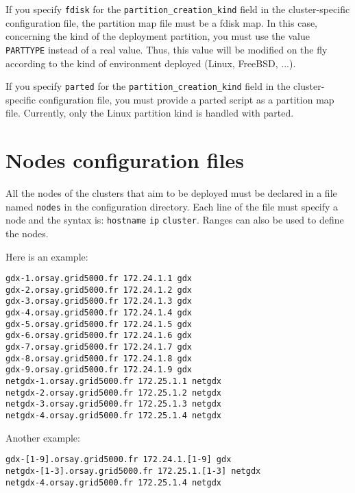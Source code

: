 \documentclass[a4wide,10pt,oneside]{book}
\begin{document}
If you specify \texttt{fdisk} for the \texttt{partition\_creation\_kind} field in the cluster-specific configuration file, the partition map file must be a fdisk map. In this case, concerning the kind of the deployment partition, you must use the value \texttt{PARTTYPE} instead of a real value. Thus, this value will be modified on the fly according to the kind of environment deployed (Linux, FreeBSD, ...).

If you specify \texttt{parted} for the \texttt{partition\_creation\_kind} field in the cluster-specific configuration file, you must provide a parted script as a partition map file. Currently, only the Linux partition kind is handled with parted.

\section{Nodes configuration files}
All the nodes of the clusters that aim to be deployed must be declared in a file named \texttt{nodes} in the configuration directory. Each line of the file must specify a node and the syntax is: \texttt{hostname} \texttt{ip} \texttt{cluster}. Ranges can also be used to define the nodes.

Here is an example:
\begin{small}
\begin{verbatim}
gdx-1.orsay.grid5000.fr 172.24.1.1 gdx
gdx-2.orsay.grid5000.fr 172.24.1.2 gdx
gdx-3.orsay.grid5000.fr 172.24.1.3 gdx
gdx-4.orsay.grid5000.fr 172.24.1.4 gdx
gdx-5.orsay.grid5000.fr 172.24.1.5 gdx
gdx-6.orsay.grid5000.fr 172.24.1.6 gdx
gdx-7.orsay.grid5000.fr 172.24.1.7 gdx
gdx-8.orsay.grid5000.fr 172.24.1.8 gdx
gdx-9.orsay.grid5000.fr 172.24.1.9 gdx
netgdx-1.orsay.grid5000.fr 172.25.1.1 netgdx
netgdx-2.orsay.grid5000.fr 172.25.1.2 netgdx
netgdx-3.orsay.grid5000.fr 172.25.1.3 netgdx
netgdx-4.orsay.grid5000.fr 172.25.1.4 netgdx
\end{verbatim}
\end{small}

Another example:
\begin{small}
\begin{verbatim}
gdx-[1-9].orsay.grid5000.fr 172.24.1.[1-9] gdx
netgdx-[1-3].orsay.grid5000.fr 172.25.1.[1-3] netgdx
netgdx-4.orsay.grid5000.fr 172.25.1.4 netgdx
\end{verbatim}
\end{small}
\end{document}

